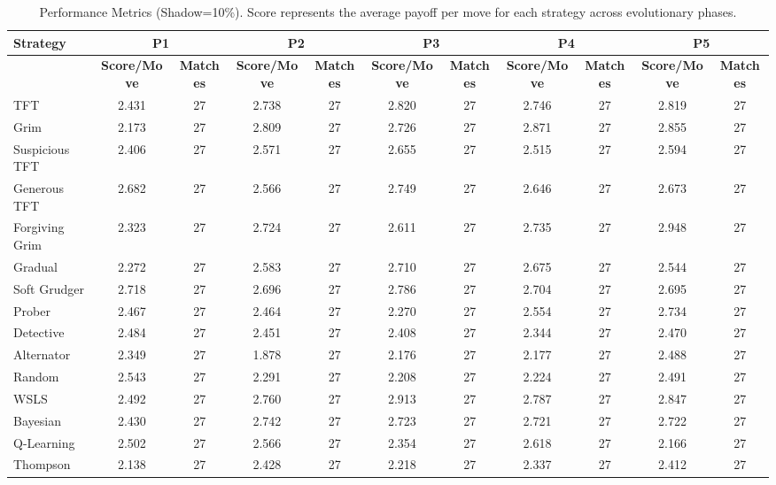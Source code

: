 \begin{table}
\centering
\scriptsize
\caption{Performance Metrics (Shadow=10\%). Score represents the average payoff per move for each strategy across evolutionary phases.}
\label{tab:experiment_20250818_102320_performance}
\begin{tabular}{|l|cc|cc|cc|cc|cc|}
\hline
\textbf{Strategy} & \multicolumn{2}{c|}{\textbf{P1}} & \multicolumn{2}{c|}{\textbf{P2}} & \multicolumn{2}{c|}{\textbf{P3}} & \multicolumn{2}{c|}{\textbf{P4}} & \multicolumn{2}{c|}{\textbf{P5}} \\
\hline
 & \textbf{Score/Move} & \textbf{Matches} & \textbf{Score/Move} & \textbf{Matches} & \textbf{Score/Move} & \textbf{Matches} & \textbf{Score/Move} & \textbf{Matches} & \textbf{Score/Move} & \textbf{Matches} \\
\hline
TFT & 2.431 & 27 & 2.738 & 27 & 2.820 & 27 & 2.746 & 27 & 2.819 & 27 \\
Grim & 2.173 & 27 & 2.809 & 27 & 2.726 & 27 & 2.871 & 27 & 2.855 & 27 \\
Suspicious TFT & 2.406 & 27 & 2.571 & 27 & 2.655 & 27 & 2.515 & 27 & 2.594 & 27 \\
Generous TFT & 2.682 & 27 & 2.566 & 27 & 2.749 & 27 & 2.646 & 27 & 2.673 & 27 \\
Forgiving Grim & 2.323 & 27 & 2.724 & 27 & 2.611 & 27 & 2.735 & 27 & 2.948 & 27 \\
Gradual & 2.272 & 27 & 2.583 & 27 & 2.710 & 27 & 2.675 & 27 & 2.544 & 27 \\
Soft Grudger & 2.718 & 27 & 2.696 & 27 & 2.786 & 27 & 2.704 & 27 & 2.695 & 27 \\
Prober & 2.467 & 27 & 2.464 & 27 & 2.270 & 27 & 2.554 & 27 & 2.734 & 27 \\
Detective & 2.484 & 27 & 2.451 & 27 & 2.408 & 27 & 2.344 & 27 & 2.470 & 27 \\
Alternator & 2.349 & 27 & 1.878 & 27 & 2.176 & 27 & 2.177 & 27 & 2.488 & 27 \\
Random & 2.543 & 27 & 2.291 & 27 & 2.208 & 27 & 2.224 & 27 & 2.491 & 27 \\
WSLS & 2.492 & 27 & 2.760 & 27 & 2.913 & 27 & 2.787 & 27 & 2.847 & 27 \\
Bayesian & 2.430 & 27 & 2.742 & 27 & 2.723 & 27 & 2.721 & 27 & 2.722 & 27 \\
Q-Learning & 2.502 & 27 & 2.566 & 27 & 2.354 & 27 & 2.618 & 27 & 2.166 & 27 \\
Thompson & 2.138 & 27 & 2.428 & 27 & 2.218 & 27 & 2.337 & 27 & 2.412 & 27 \\

\end{tabular}
\end{table}
